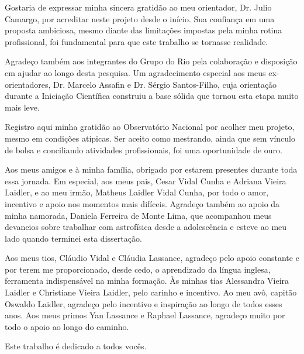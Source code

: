
Gostaria de expressar minha sincera gratidão ao meu orientador, Dr. Julio Camargo, por acreditar neste projeto desde o início. Sua confiança em uma proposta ambiciosa, mesmo diante das limitações impostas pela minha rotina profissional, foi fundamental para que este trabalho se tornasse realidade.

Agradeço também aos integrantes do Grupo do Rio pela colaboração e disposição em ajudar ao longo desta pesquisa. Um agradecimento especial aos meus ex-orientadores, Dr. Marcelo Assafin e Dr. Sérgio Santos-Filho, cuja orientação durante a Iniciação Científica construiu a base sólida que tornou esta etapa muito mais leve.

Registro aqui minha gratidão ao Observatório Nacional por acolher meu projeto, mesmo em condições atípicas. Ser aceito como mestrando, ainda que sem vínculo de bolsa e conciliando atividades profissionais, foi uma oportunidade de ouro.

Aos meus amigos e à minha família, obrigado por estarem presentes durante toda essa jornada. Em especial, aos meus pais, Cesar Vidal Cunha e Adriana Vieira Laidler, e ao meu irmão, Matheus Laidler Vidal Cunha, por todo o amor, incentivo e apoio nos momentos mais difíceis. Agradeço também ao apoio da minha namorada, Daniela Ferreira de Monte Lima, que acompanhou meus devaneios sobre trabalhar com astrofísica desde a adolescência e esteve ao meu lado quando terminei esta dissertação.

Aos meus tios, Cláudio Vidal e Cláudia Lassance, agradeço pelo apoio constante e por terem me proporcionado, desde cedo, o aprendizado da língua inglesa, ferramenta indispensável na minha formação. Às minhas tias Alessandra Vieira Laidler e Christiane Vieira Laidler, pelo carinho e incentivo. Ao meu avô, capitão Oswaldo Laidler, agradeço pelo incentivo e inspiração ao longo de todos esses anos. Aos meus primos Yan Lassance e Raphael Lassance, agradeço muito por todo o apoio ao longo do caminho.

Este trabalho é dedicado a todos vocês.
